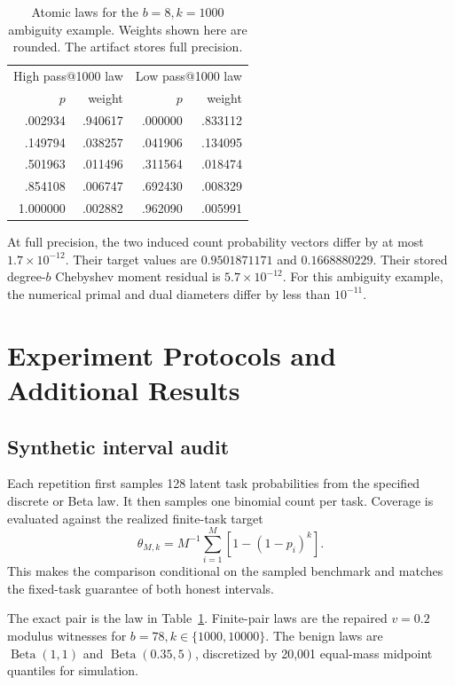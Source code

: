 \documentclass[twoside]{article}
\begin{document}
\begin{table}[t]
\caption{Atomic laws for the \(b=8,k=1000\) ambiguity example. Weights shown
here are rounded. The artifact stores full precision.}
\label{tab:atoms}
\centering
\small
\begin{tabular}{rrrr}
\toprule
\multicolumn{2}{c}{High pass@1000 law} &
\multicolumn{2}{c}{Low pass@1000 law}\\
\(p\) & weight & \(p\) & weight\\
\midrule
.002934 & .940617 & .000000 & .833112\\
.149794 & .038257 & .041906 & .134095\\
.501963 & .011496 & .311564 & .018474\\
.854108 & .006747 & .692430 & .008329\\
1.000000 & .002882 & .962090 & .005991\\
\bottomrule
\end{tabular}
\end{table}

At full precision, the two induced count probability vectors differ by at
most \(1.7\times10^{-12}\). Their target values are \(0.9501871171\) and
\(0.1668880229\). Their stored degree-\(b\) Chebyshev moment residual is
\(5.7\times10^{-12}\). For this ambiguity example, the numerical primal and
dual diameters differ by less than \(10^{-11}\).

\section{Experiment Protocols and Additional Results}

\subsection{Synthetic interval audit}

Each repetition first samples 128 latent task probabilities from the specified
discrete or Beta law. It then samples one binomial count per task. Coverage is
evaluated against the realized finite-task target
\[
 \theta_{M,k}=M^{-1}\sum_{i=1}^M[1-(1-p_i)^k].
\]
This makes the comparison conditional on the sampled benchmark and matches
the fixed-task guarantee of both honest intervals.

The exact pair is the law in Table~\ref{tab:atoms}. Finite-pair laws are the
repaired \(v=0.2\) modulus witnesses for \(b=78,k\in\{1000,10000\}\).
The benign laws are \(\operatorname{Beta}(1,1)\) and
\(\operatorname{Beta}(0.35,5)\), discretized by 20,001 equal-mass midpoint
quantiles for simulation.
\end{document}
